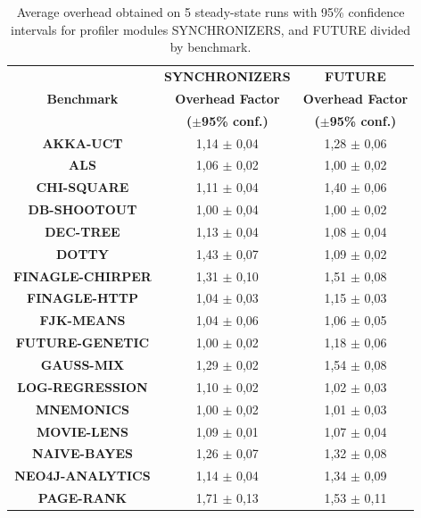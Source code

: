 \documentclass[]{usiinfthesis}
\begin{document}
\begin{table}
\centering
\caption[Overhead pt.2]{Average overhead obtained on 5 steady-state runs with 95\% confidence intervals for profiler modules SYNCHRONIZERS, and FUTURE divided by benchmark.}
\label{tab:11}
\begin{tabular}{|c|c|c|}
\hline
		 & 	\textbf{	SYNCHRONIZERS	}	 & 	\textbf{	FUTURE	}	\\
\textbf{	Benchmark	}&	\textbf{	Overhead Factor	}	 & 	\textbf{	Overhead Factor	}	\\
		 & 	\textbf{	 ($\pm$95\% conf.) 	}	 & 	\textbf{	 ($\pm$95\% conf.) 	}	\\
		 
\hline
\textbf{	AKKA-UCT	}&	 1,14 	 $\pm$ 	 0,04 	 & 	 1,28 	 $\pm$ 	 0,06 	\\
\textbf{	ALS	}&	 1,06 	 $\pm$ 	 0,02 	 & 	 1,00 	 $\pm$ 	 0,02 	\\
\textbf{	CHI-SQUARE	}&	 1,11 	 $\pm$ 	 0,04 	 & 	 1,40 	 $\pm$ 	 0,06 	\\
\textbf{	DB-SHOOTOUT	}&	 1,00 	 $\pm$ 	 0,04 	 & 	 1,00 	 $\pm$ 	 0,02 	\\
\textbf{	DEC-TREE	}&	 1,13 	 $\pm$ 	 0,04 	 & 	 1,08 	 $\pm$ 	 0,04 	\\
\textbf{	DOTTY	}&	 1,43 	 $\pm$ 	 0,07 	 & 	 1,09 	 $\pm$ 	 0,02 	\\
\textbf{	FINAGLE-CHIRPER	}&	 1,31 	 $\pm$ 	 0,10 	 & 	 1,51 	 $\pm$ 	 0,08 	\\
\textbf{	FINAGLE-HTTP	}&	 1,04 	 $\pm$ 	 0,03 	 & 	 1,15 	 $\pm$ 	 0,03 	\\
\textbf{	FJK-MEANS	}&	 1,04 	 $\pm$ 	 0,06 	 & 	 1,06 	 $\pm$ 	 0,05 	\\
\textbf{	FUTURE-GENETIC	}&	 1,00 	 $\pm$ 	 0,02 	 & 	 1,18 	 $\pm$ 	 0,06 	\\
\textbf{	GAUSS-MIX	}&	 1,29 	 $\pm$ 	 0,02 	 & 	 1,54 	 $\pm$ 	 0,08 	\\
\textbf{	LOG-REGRESSION	}&	 1,10 	 $\pm$ 	 0,02 	 & 	 1,02 	 $\pm$ 	 0,03 	\\
\textbf{	MNEMONICS	}&	 1,00 	 $\pm$ 	 0,02 	 & 	 1,01 	 $\pm$ 	 0,03 	\\
\textbf{	MOVIE-LENS	}&	 1,09 	 $\pm$ 	 0,01 	 & 	 1,07 	 $\pm$ 	 0,04 	\\
\textbf{	NAIVE-BAYES	}&	 1,26 	 $\pm$ 	 0,07 	 & 	 1,32 	 $\pm$ 	 0,08 	\\
\textbf{	NEO4J-ANALYTICS	}&	 1,14 	 $\pm$ 	 0,04 	 & 	 1,34 	 $\pm$ 	 0,09 	\\
\textbf{	PAGE-RANK	}&	 1,71 	 $\pm$ 	 0,13 	 & 	 1,53 	 $\pm$ 	 0,11 	\\

\end{tabular}
\end{table}
\end{document}
